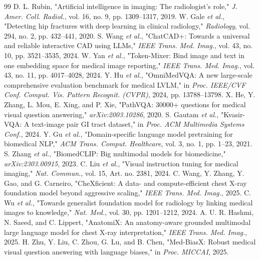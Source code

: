 \documentclass[journal,twoside,web]{ieeecolor}
\begin{document}
\begin{thebibliography}{99}
 D. L. Rubin, "Artificial intelligence in imaging: The radiologist's role," \textit{J. Amer. Coll. Radiol.}, vol. 16, no. 9, pp. 1309--1317, 2019.
 W. Gale \textit{et al.}, "Detecting hip fractures with deep learning in clinical radiology," \textit{Radiology}, vol. 294, no. 2, pp. 432--441, 2020.
 S. Wang \textit{et al.}, "ChatCAD+: Towards a universal and reliable interactive CAD using LLMs," \textit{IEEE Trans. Med. Imag.}, vol. 43, no. 10, pp. 3521--3535, 2024.
 W. Yan \textit{et al.}, "Token-Mixer: Bind image and text in one embedding space for medical image reporting," \textit{IEEE Trans. Med. Imag.}, vol. 43, no. 11, pp. 4017--4028, 2024.
 Y. Hu \textit{et al.}, "OmniMedVQA: A new large-scale comprehensive evaluation benchmark for medical LVLM," in \textit{Proc. IEEE/CVF Conf. Comput. Vis. Pattern Recognit. (CVPR)}, 2024, pp. 13788--13798.
 X. He, Y. Zhang, L. Mou, E. Xing, and P. Xie, "PathVQA: 30000+ questions for medical visual question answering," \textit{arXiv:2003.10286}, 2020.
 S. Gautam \textit{et al.}, "Kvasir-VQA: A text-image pair GI tract dataset," in \textit{Proc. ACM Multimedia Systems Conf.}, 2024.
 Y. Gu \textit{et al.}, "Domain-specific language model pretraining for biomedical NLP," \textit{ACM Trans. Comput. Healthcare}, vol. 3, no. 1, pp. 1--23, 2021.
 S. Zhang \textit{et al.}, "BiomedCLIP: Big multimodal models for biomedicine," \textit{arXiv:2303.00915}, 2023.
 C. Liu \textit{et al.}, "Visual instruction tuning for medical imaging," \textit{Nat. Commun.}, vol. 15, Art. no. 2381, 2024.
 C. Wang, Y. Zhang, Y. Gao, and G. Carneiro, "CheXficient: A data- and compute-efficient chest X-ray foundation model beyond aggressive scaling," \textit{IEEE Trans. Med. Imag.}, 2025.
 C. Wu \textit{et al.}, "Towards generalist foundation model for radiology by linking medical images to knowledge," \textit{Nat. Med.}, vol. 30, pp. 1201--1212, 2024.
 A. U. R. Hashmi, N. Saeed, and C. Lippert, "AnatomiX: An anatomy-aware grounded multimodal large language model for chest X-ray interpretation," \textit{IEEE Trans. Med. Imag.}, 2025.
 H. Zhu, Y. Liu, C. Zhou, G. Lu, and B. Chen, "Med-BiasX: Robust medical visual question answering with language biases," in \textit{Proc. MICCAI}, 2025.

\end{thebibliography}
\end{document}
